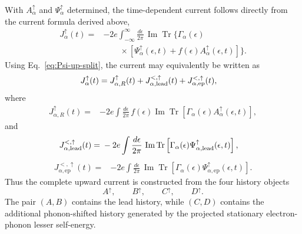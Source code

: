 \documentclass[
 reprint,
 superscriptaddress,
 amsmath,amssymb,
 aps,prb,
 longbibliography,
 floatfix
]{revtex4-2}
\newcommand{\ep}{\mathrm{ep}}
\begin{document}
With $A_\alpha^\uparrow$ and $\Psi_\alpha^\uparrow$ determined, the time-dependent current follows directly from the current formula derived above,
\begin{equation}
\boxed{
\begin{aligned}
J_\alpha^\uparrow(t)
={}&
-2e
\int_{-\infty}^{\infty}
\frac{d\epsilon}{2\pi}\,
\operatorname{Im}
\operatorname{Tr}
\Bigg\{
\Gamma_\alpha(\epsilon)
\\
&\qquad\times
\left[
\Psi_\alpha^\uparrow(\epsilon,t)
+
f(\epsilon)
A_\alpha^\uparrow(\epsilon,t)
\right]
\Bigg\}.
\end{aligned}}
\label{eq:Jalpha-up-final}
\end{equation}
Using Eq.~\eqref{eq:Psi-up-split}, the current may equivalently be written as
\begin{equation*}
\begin{aligned}
J_\alpha^\uparrow(t)
={}&
J_{\alpha,R}^\uparrow(t)
+
J_{\alpha,\rm lead}^{<,\uparrow}(t)
+
J_{\alpha,\ep}^{<,\uparrow}(t),
\end{aligned}
\end{equation*}
where
\begin{equation*}
\begin{aligned}
J_{\alpha,R}^\uparrow(t)
={}&
-2e
\int\frac{d\epsilon}{2\pi}\,
f(\epsilon)
\operatorname{Im}
\operatorname{Tr}
\left[
\Gamma_\alpha(\epsilon)
A_\alpha^\uparrow(\epsilon,t)
\right],
\end{aligned}
\end{equation*}
and
\begin{equation*}
\begin{aligned}
J_{\alpha,\rm lead}^{<,\uparrow}(t)
={}&
-2e
\int\frac{d\epsilon}{2\pi}\,
\operatorname{Im}
\operatorname{Tr}
\left[
\Gamma_\alpha(\epsilon)
\Psi_{\alpha,\rm lead}^\uparrow(\epsilon,t)
\right],
\end{aligned}
\end{equation*}
\begin{equation*}
\begin{aligned}
J_{\alpha,\ep}^{<,\uparrow}(t)
={}&
-2e
\int\frac{d\epsilon}{2\pi}\,
\operatorname{Im}
\operatorname{Tr}
\left[
\Gamma_\alpha(\epsilon)
\Psi_{\alpha,\ep}^\uparrow(\epsilon,t)
\right].
\end{aligned}
\end{equation*}
Thus the complete upward current is constructed from the four history objects
\begin{equation*}
A^\uparrow,\qquad
B^\uparrow,\qquad
C^\uparrow,\qquad
D^\uparrow.
\end{equation*}
The pair $(A,B)$ contains the lead history, while $(C,D)$ contains the additional phonon-shifted history generated by the projected stationary electron-phonon lesser self-energy.
\end{document}
